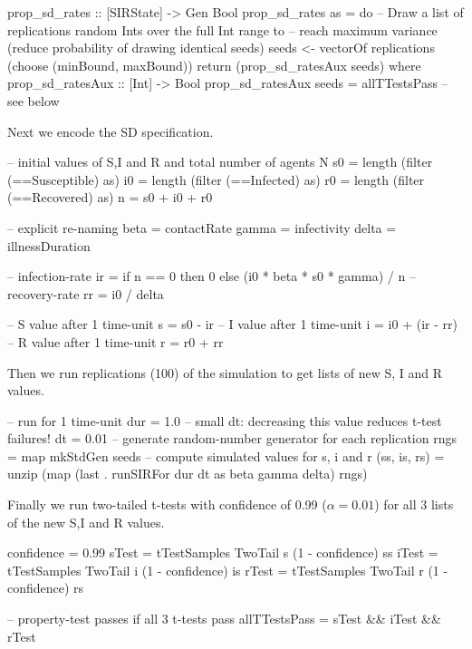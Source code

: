 \begin{HaskellCode}
prop_sd_rates :: [SIRState] -> Gen Bool
prop_sd_rates as = do
    -- Draw a list of replications random Ints over the full Int range to  
    -- reach maximum variance (reduce probability of drawing identical seeds)
    seeds <- vectorOf replications (choose (minBound, maxBound))
    return (prop_sd_ratesAux seeds)
  where
    prop_sd_ratesAux :: [Int] -> Bool
    prop_sd_ratesAux seeds = allTTestsPass -- see below
\end{HaskellCode}

Next we encode the SD specification.

\begin{HaskellCode}
-- initial values of S,I and R and total number of agents N
s0 = length (filter (==Susceptible) as)
i0 = length (filter (==Infected) as)
r0 = length (filter (==Recovered) as)
n  = s0 + i0 + r0

-- explicit re-naming
beta  = contactRate
gamma = infectivity
delta = illnessDuration

-- infection-rate
ir = if n == 0 then 0 else (i0 * beta * s0 * gamma) / n
-- recovery-rate 
rr = i0 / delta

-- S value after 1 time-unit 
s = s0 - ir
-- I value after 1 time-unit
i = i0 + (ir - rr)
-- R value after 1 time-unit
r = r0 + rr
\end{HaskellCode}

Then we run replications (100) of the simulation to get lists of new S, I and R values.

\begin{HaskellCode}
-- run for 1 time-unit
dur = 1.0
-- small dt: decreasing this value reduces t-test failures!
dt = 0.01
-- generate random-number generator for each replication
rngs = map mkStdGen seeds
-- compute simulated values for s, i and r
(ss, is, rs) = unzip (map (last . runSIRFor dur dt as beta gamma delta) rngs)
\end{HaskellCode}

Finally we run two-tailed t-tests with confidence of 0.99 ($\alpha = 0.01$) for all 3 lists of the new S,I and R values.

\begin{HaskellCode}
confidence = 0.99
sTest = tTestSamples TwoTail s (1 - confidence) ss
iTest = tTestSamples TwoTail i (1 - confidence) is
rTest = tTestSamples TwoTail r (1 - confidence) rs

-- property-test passes if all 3 t-tests pass
allTTestsPass = sTest && iTest && rTest
\end{HaskellCode}

